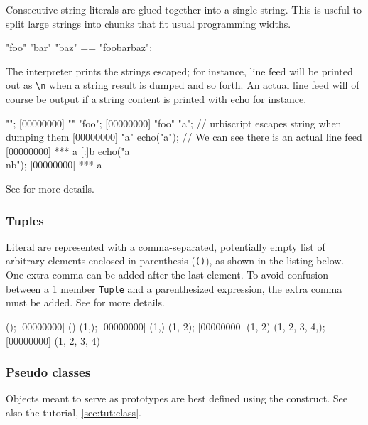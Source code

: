 Consecutive string literals are glued together into a single string.
This is useful to split large strings into chunks that fit usual
programming widths.

\begin{urbiassert}
"foo" "bar" "baz" == "foobarbaz";
\end{urbiassert}

The interpreter prints the strings escaped; for instance, line feed
will be printed out as \lstinline|\n| when a string result is dumped
and so forth. An actual line feed will of course be output if a string
content is printed with echo for instance.

\begin{urbiscript}
"";
[00000000] ""
"foo";
[00000000] "foo"
"a\nb"; // urbiscript escapes string when dumping them
[00000000] "a\nb"
echo("a\nb"); // We can see there is an actual line feed
[00000000] *** a
[:]b
echo("a\\nb");
[00000000] *** a\nb
\end{urbiscript}

See  for more details.

\subsubsection{Tuples}
\label{sec:lang:tuples}

Literal  are represented with a comma-separated, potentially
empty list of arbitrary elements enclosed in parenthesis (\lstinline|()|),
as shown in the listing below.  One extra comma can be added after the last
element.  To avoid confusion between a 1 member \lstinline|Tuple| and a
parenthesized expression, the extra comma must be added.  See
 for more details.

\begin{urbiscript}
();
[00000000] ()
(1,);
[00000000] (1,)
(1, 2);
[00000000] (1, 2)
(1, 2, 3, 4,);
[00000000] (1, 2, 3, 4)
\end{urbiscript}


\subsubsection{Pseudo classes}
\label{sec:lang:class}

Objects meant to serve as prototypes are best defined using the
 construct.  See also the tutorial, \autoref{sec:tut:class}.


